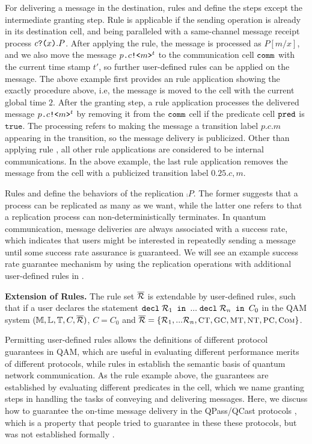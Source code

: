 For delivering a message in the destination,
rules  and  define the steps except the intermediate granting step.
Rule  is applicable if the sending operation is already in its destination cell, and being paralleled with a same-channel message receipt process $c\texttt{?(}x\texttt{)}.P$. After applying the rule, the message is processed as $P[m/x]$, and we also move the message $p\texttt{.}c\texttt{!<}m\texttt{>}^t$ to the communication cell $\texttt{comm}$ with the current time stamp $t'$, so further user-defined rules can be applied on the message.
The above example first provides an  rule application showing the exactly procedure above, i.e, the message is moved to the  cell with the current global time $2$.
After the granting step,
a  rule application processes the delivered message $p\texttt{.}c\texttt{!<}m\texttt{>}^t$ by removing it from the $\texttt{comm}$ cell if the predicate cell $\texttt{pred}$ is $\texttt{true}$. The processing refers to making the message a transition label $p.c.m$ appearing in the transition,
so the message delivery is publicized. Other than applying rule , all other rule applications are considered to be internal communications. 
In the above example, the last  rule application removes the message from the cell with a publicized transition label $0.25.c,m$. 

Rules  and  define the behaviors of the replication $\comp{P}$.
The former suggests that a process can be replicated as many as we want, while the latter one refers to that a replication process can non-deterministically terminates.
In quantum communication, message deliveries are always associated with a success rate,
which indicates that users might be interested in repeatedly sending a message until some success rate assurance is guaranteed.
We will see an example success rate guarantee mechanism by using the replication operations with additional user-defined rules in .

\noindent\textbf{Extension of Rules.}
The rule set $\overline{\mathcal{R}}$ is extendable by user-defined rules, 
such that if a user declares the statement $\texttt{decl}\;\mathcal{R}_1\texttt{ in }...\; \texttt{decl}\;\mathcal{R}_n\texttt{ in }C_0$
in the QAM system $(\mathbb{M},\mathbb{L},\mathbb{T},C,\overline{\mathcal{R}})$, $C=C_0$ and $\overline{\mathcal{R}}=\{\mathcal{R}_1,...\mathcal{R}_n,{\small \textsc{CT}},{\small \textsc{GC}},{\small \textsc{MT}},{\small \textsc{NT}}, {\small \textsc{PC}},{\small \textsc{Com}}\}$.

Permitting user-defined rules allows the definitions of different protocol guarantees in QAM,
which are useful in evaluating different performance merits of different protocols,
while rules in  establish the semantic basis of quantum network communication.
As the  rule example above, the guarantees are established by evaluating different predicates in the  cell,
which we name granting steps in handling the tasks of conveying and delivering messages.
Here, we discuss how to guarantee the on-time message delivery in the QPass/QCast protocols \cite{10.1145/3387514.3405853},
which is a property that people tried to guarantee in these these protocols, but was not established formally \cite{10.1145/3387514.3405853}.

